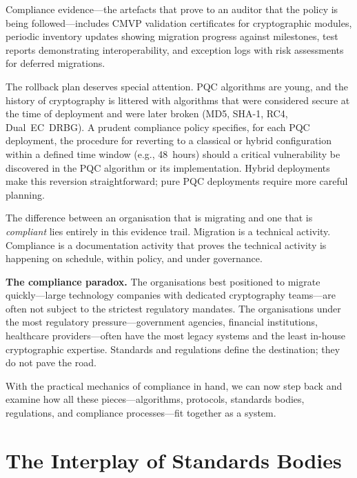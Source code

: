 Compliance evidence---the artefacts that prove to an auditor that the policy is being followed---includes CMVP validation certificates for cryptographic modules, periodic inventory updates showing migration progress against milestones, test reports demonstrating interoperability, and exception logs with risk assessments for deferred migrations.

The rollback plan deserves special attention. PQC algorithms are young, and the history of cryptography is littered with algorithms that were considered secure at the time of deployment and were later broken (MD5, SHA-1, RC4, Dual~EC~DRBG). A prudent compliance policy specifies, for each PQC deployment, the procedure for reverting to a classical or hybrid configuration within a defined time window (e.g., 48~hours) should a critical vulnerability be discovered in the PQC algorithm or its implementation. Hybrid deployments make this reversion straightforward; pure PQC deployments require more careful planning.

The difference between an organisation that is migrating and one that is \emph{compliant} lies entirely in this evidence trail. Migration is a technical activity. Compliance is a documentation activity that proves the technical activity is happening on schedule, within policy, and under governance.

\begin{svgraybox}
\textbf{The compliance paradox.} The organisations best positioned to migrate quickly---large technology companies with dedicated cryptography teams---are often not subject to the strictest regulatory mandates. The organisations under the most regulatory pressure---government agencies, financial institutions, healthcare providers---often have the most legacy systems and the least in-house cryptographic expertise. Standards and regulations define the destination; they do not pave the road.
\end{svgraybox}

With the practical mechanics of compliance in hand, we can now step back and examine how all these pieces---algorithms, protocols, standards bodies, regulations, and compliance processes---fit together as a system.


\section{The Interplay of Standards Bodies}
\label{sec:interplay}

